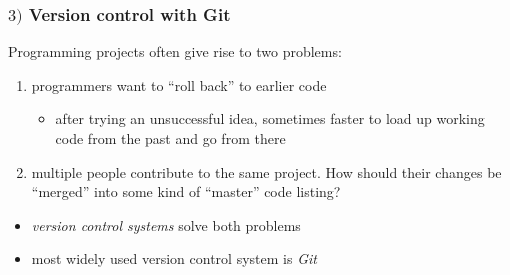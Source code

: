 \documentclass[english,14pt]{beamer}
\newcommand\red[1]{{\color{red} #1}}
\begin{document}

\begin{frame}[fragile]

\frametitle{$3)$ Version control with Git}

Programming projects often give rise to two problems:
\begin{enumerate}
	\item programmers want to ``roll back'' to earlier code
	\begin{itemize}
		\item after trying an unsuccessful idea, sometimes faster to load up working code from the past and go 	from there
	\end{itemize}
	\item multiple people contribute to the same project. How should their changes be ``merged'' into some
kind of ``master'' code listing?
\end{enumerate}


\begin{itemize}
	\item \red{\emph{version control systems}} solve both problems
	\item most widely used version control system is \red{\emph{Git}}
\end{itemize}

\end{frame}

\end{document}
